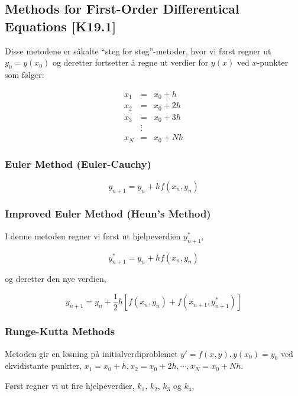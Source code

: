 \documentclass[norsk, a4paper, 12pt, titlepage]{article}
\begin{document}
\subsection{Methods for First-Order Differentical Equations [K19.1]}
Disse metodene er såkalte ``steg for steg''-metoder, hvor vi først
regner ut $y_{0} = y(x_{0})$ og deretter fortsetter å regne ut verdier
for $y(x)$ ved $x$-punkter som følger:

\begin{eqnarray*}
x_{1} & = & x_{0} + h \\
x_{2} & = & x_{0} + 2h \\
x_{3} & = & x_{0} + 3h \\
      & \vdots & \\
x_{N} & = & x_{0} + Nh
\end{eqnarray*}

\subsubsection{Euler Method (Euler-Cauchy)}

\begin{equation}
y_{n+1} = y_{n} + hf(x_{n}, y_{n})
\end{equation}


\subsubsection{Improved Euler Method (Heun's Method)}
I denne metoden regner vi først ut hjelpeverdien $y_{n+1}^{*}$,

\begin{equation}
y_{n+1}^{*} = y_{n} + hf(x_{n}, y_{n})
\end{equation}

og deretter den nye verdien,

\begin{equation}
y_{n+1} = y_{n} + \frac{1}{2}h\left[f(x_{n}, y_{n}) + f(x_{n+1},
  y_{n+1}^{*})\right]
\end{equation}

\subsubsection{Runge-Kutta Methods}
Metoden gir en løsning på initialverdiproblemet $y' = f(x, y),
y(x_{0}) = y_{0}$ ved ekvidistante punkter, $x_{1} = x_{0} + h, x_{2}
= x_{0} + 2h, \cdots, x_{N} = x_{0} + Nh$.

Først regner vi ut fire hjelpeverdier, $k_{1}$, $k_{2}$, $k_{3}$ og
$k_{4}$,
\end{document}
